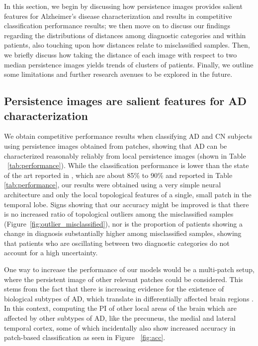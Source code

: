 \documentclass{article}
\begin{document}
In this section, we begin by discussing how persistence images
provides salient features for Alzheimer's disease characterization and results in competitive
classification performance results; we then move on to discuss our findings regarding the
distributions of distances among diagnostic categories and within patients, also touching upon how
distances relate to misclassified samples. Then, we briefly discuss how taking the distance of each
image with respect to two median persistence images yields trends of clusters of patients. Finally,
we outline some limitations and further research avenues to be explored in the future.

\subsection{Persistence images are salient features for AD characterization}

We obtain competitive performance results when classifying AD and CN subjects using persistence
images obtained from patches, showing that AD can be characterized reasonably reliably from local
persistence images (shown in Table ~\ref{tab:performance}). While the classification performance is
lower than the state of the art reported in \citep{liu2018anatomical}, which are about 85\% to 90\%
and reported in Table \ref{tab:performance}, our results were obtained using a very simple neural
architecture and only the local topological features of a single, small patch in the temporal lobe.
Signs showing that our accuracy might be improved is that there is no increased ratio of topological
outliers among the misclassified samples (Figure~\ref{fig:outlier_misclassified}), nor is the
proportion of patients showing a change in diagnosis substantially higher among misclassified
samples, showing that patients who are oscillating between two diagnostic categories do not account
for a high uncertainty.

One way to increase the performance of our models would be a multi-patch setup, where the persistent
image of other relevant patches could be considered. This stems from the fact that there is
increasing evidence for the existence of biological subtypes of AD, which translate in
differentially affected brain regions \citep{tijms2020pathophysiological,poulakis2018heterogeneous}.
In this context, computing the PI of other local areas of the brain which are affected by other
subtypes of AD, like the precuneus, the medial and lateral temporal cortex, some of which
incidentally also show increased accuracy in patch-based classification as seen in Figure
~\ref{fig:acc}.
\end{document}
